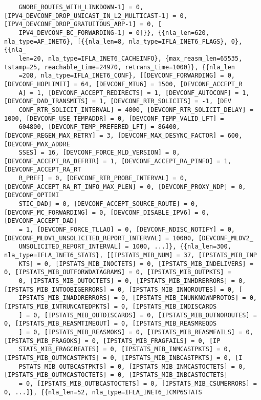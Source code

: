 \documentclass[pdf, unicode, 12pt, a4paper,oneside,fleqn]{article}
\begin{document}
{\begin{verbatim}
    GNORE_ROUTES_WITH_LINKDOWN-1] = 0, [IPV4_DEVCONF_DROP_UNICAST_IN_L2_MULTICAST-1] = 0, [IPV4_DEVCONF_DROP_GRATUITOUS_ARP-1] = 0, [
    IPV4_DEVCONF_BC_FORWARDING-1] = 0]}}, {{nla_len=620, nla_type=AF_INET6}, [{{nla_len=8, nla_type=IFLA_INET6_FLAGS}, 0}, {{nla_
    len=20, nla_type=IFLA_INET6_CACHEINFO}, {max_reasm_len=65535, tstamp=25, reachable_time=24970, retrans_time=1000}}, {{nla_len
    =208, nla_type=IFLA_INET6_CONF}, [[DEVCONF_FORWARDING] = 0, [DEVCONF_HOPLIMIT] = 64, [DEVCONF_MTU6] = 1500, [DEVCONF_ACCEPT_R
    A] = 1, [DEVCONF_ACCEPT_REDIRECTS] = 1, [DEVCONF_AUTOCONF] = 1, [DEVCONF_DAD_TRANSMITS] = 1, [DEVCONF_RTR_SOLICITS] = -1, [DEV
    CONF_RTR_SOLICIT_INTERVAL] = 4000, [DEVCONF_RTR_SOLICIT_DELAY] = 1000, [DEVCONF_USE_TEMPADDR] = 0, [DEVCONF_TEMP_VALID_LFT] =
    604800, [DEVCONF_TEMP_PREFERED_LFT] = 86400, [DEVCONF_REGEN_MAX_RETRY] = 3, [DEVCONF_MAX_DESYNC_FACTOR] = 600, [DEVCONF_MAX_ADDRE
    SSES] = 16, [DEVCONF_FORCE_MLD_VERSION] = 0, [DEVCONF_ACCEPT_RA_DEFRTR] = 1, [DEVCONF_ACCEPT_RA_PINFO] = 1, [DEVCONF_ACCEPT_RA_RT
    R_PREF] = 0, [DEVCONF_RTR_PROBE_INTERVAL] = 0, [DEVCONF_ACCEPT_RA_RT_INFO_MAX_PLEN] = 0, [DEVCONF_PROXY_NDP] = 0, [DEVCONF_OPTIMI
    STIC_DAD] = 0, [DEVCONF_ACCEPT_SOURCE_ROUTE] = 0, [DEVCONF_MC_FORWARDING] = 0, [DEVCONF_DISABLE_IPV6] = 0, [DEVCONF_ACCEPT_DAD] 
    = 1, [DEVCONF_FORCE_TLLAO] = 0, [DEVCONF_NDISC_NOTIFY] = 0, [DEVCONF_MLDV1_UNSOLICITED_REPORT_INTERVAL] = 10000, [DEVCONF_MLDV2_
    UNSOLICITED_REPORT_INTERVAL] = 1000, ...]}, {{nla_len=300, nla_type=IFLA_INET6_STATS}, [[IPSTATS_MIB_NUM] = 37, [IPSTATS_MIB_INP
    KTS] = 0, [IPSTATS_MIB_INOCTETS] = 0, [IPSTATS_MIB_INDELIVERS] = 0, [IPSTATS_MIB_OUTFORWDATAGRAMS] = 0, [IPSTATS_MIB_OUTPKTS] = 
    0, [IPSTATS_MIB_OUTOCTETS] = 0, [IPSTATS_MIB_INHDRERRORS] = 0, [IPSTATS_MIB_INTOOBIGERRORS] = 0, [IPSTATS_MIB_INNOROUTES] = 0, [
    IPSTATS_MIB_INADDRERRORS] = 0, [IPSTATS_MIB_INUNKNOWNPROTOS] = 0, [IPSTATS_MIB_INTRUNCATEDPKTS] = 0, [IPSTATS_MIB_INDISCARDS
    ] = 0, [IPSTATS_MIB_OUTDISCARDS] = 0, [IPSTATS_MIB_OUTNOROUTES] = 0, [IPSTATS_MIB_REASMTIMEOUT] = 0, [IPSTATS_MIB_REASMREQDS
    ] = 0, [IPSTATS_MIB_REASMOKS] = 0, [IPSTATS_MIB_REASMFAILS] = 0, [IPSTATS_MIB_FRAGOKS] = 0, [IPSTATS_MIB_FRAGFAILS] = 0, [IP
    STATS_MIB_FRAGCREATES] = 0, [IPSTATS_MIB_INMCASTPKTS] = 0, [IPSTATS_MIB_OUTMCASTPKTS] = 0, [IPSTATS_MIB_INBCASTPKTS] = 0, [I
    PSTATS_MIB_OUTBCASTPKTS] = 0, [IPSTATS_MIB_INMCASTOCTETS] = 0, [IPSTATS_MIB_OUTMCASTOCTETS] = 0, [IPSTATS_MIB_INBCASTOCTETS]
    = 0, [IPSTATS_MIB_OUTBCASTOCTETS] = 0, [IPSTATS_MIB_CSUMERRORS] = 0, ...]}, {{nla_len=52, nla_type=IFLA_INET6_ICMP6STATS

\end{verbatim}}
\end{document}
